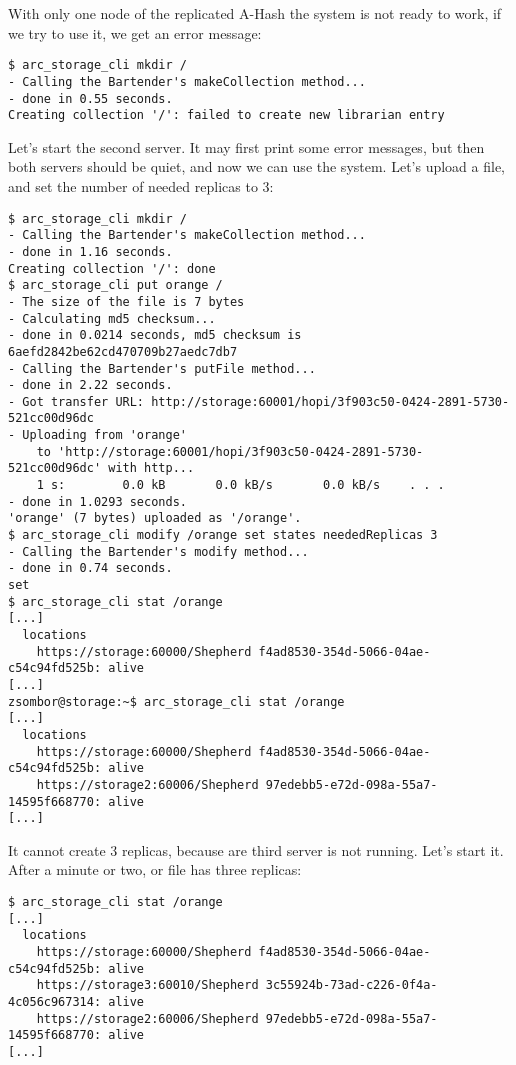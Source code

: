 \documentclass{book}
\begin{document}
With only one node of the replicated A-Hash the system is not ready to work, if we try to use it, we get an error message:
\begin{verbatim}
$ arc_storage_cli mkdir /
- Calling the Bartender's makeCollection method...
- done in 0.55 seconds.
Creating collection '/': failed to create new librarian entry
\end{verbatim}

Let's start the second server. It may first print some error messages, but then both servers should be quiet, and now we can use the system. Let's upload a file, and set the number of needed replicas to 3:

\begin{verbatim}
$ arc_storage_cli mkdir /
- Calling the Bartender's makeCollection method...
- done in 1.16 seconds.
Creating collection '/': done
$ arc_storage_cli put orange /
- The size of the file is 7 bytes
- Calculating md5 checksum...
- done in 0.0214 seconds, md5 checksum is 6aefd2842be62cd470709b27aedc7db7
- Calling the Bartender's putFile method...
- done in 2.22 seconds.
- Got transfer URL: http://storage:60001/hopi/3f903c50-0424-2891-5730-521cc00d96dc
- Uploading from 'orange'
    to 'http://storage:60001/hopi/3f903c50-0424-2891-5730-521cc00d96dc' with http...
    1 s:        0.0 kB       0.0 kB/s       0.0 kB/s    . . .       
- done in 1.0293 seconds.
'orange' (7 bytes) uploaded as '/orange'.
$ arc_storage_cli modify /orange set states neededReplicas 3
- Calling the Bartender's modify method...
- done in 0.74 seconds.
set
$ arc_storage_cli stat /orange
[...]
  locations
    https://storage:60000/Shepherd f4ad8530-354d-5066-04ae-c54c94fd525b: alive
[...]
zsombor@storage:~$ arc_storage_cli stat /orange
[...]
  locations
    https://storage:60000/Shepherd f4ad8530-354d-5066-04ae-c54c94fd525b: alive
    https://storage2:60006/Shepherd 97edebb5-e72d-098a-55a7-14595f668770: alive
[...]    
\end{verbatim}

It cannot create 3 replicas, because are third server is not running. Let's start it. After a minute or two, or file has three replicas:

\begin{verbatim}
$ arc_storage_cli stat /orange
[...]
  locations
    https://storage:60000/Shepherd f4ad8530-354d-5066-04ae-c54c94fd525b: alive
    https://storage3:60010/Shepherd 3c55924b-73ad-c226-0f4a-4c056c967314: alive
    https://storage2:60006/Shepherd 97edebb5-e72d-098a-55a7-14595f668770: alive
[...]
\end{verbatim}
\end{document}
